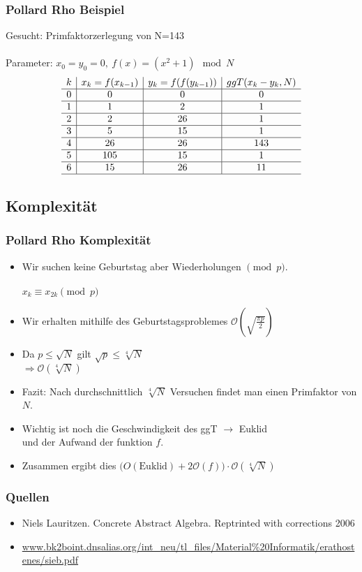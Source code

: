 \documentclass[mathserif, compress]{beamer}
\begin{document}
\begin{frame}
  \frametitle{Pollard Rho Beispiel}
Gesucht: Primfaktorzerlegung von N=143\\
\ \\
Parameter: $x_0 = y_0 = 0, \ f(x)=(x^2+1)\mod N$
	$$
  \begin{array}{c|c|c|c}
	k & x_k = f(x_{k-1}) & y_k = f(f(y_{k-1})) & ggT(x_k - y_k, N) \\ \hline 
        0 & 0 & 0 & 0 \\ \hline
	1 & 1 & 2 & 1 \\ \hline
	2 & 2 & 26 & 1 \\ \hline
	3 & 5 & 15 & 1 \\ \hline
	4 & 26 & 26 & 143 \\ \hline
	5 & 105 & 15 & 1 \\ \hline
	6 & 15 & 26 & 11 \\ \hline
  \end{array}
	$$
\end{frame}

\subsection{Komplexit\"at}

\begin{frame}
  \frametitle{Pollard Rho Komplexit\"at}
  \begin{itemize}
    \item Wir suchen keine Geburtstag aber Wiederholungen $\pmod p$.\\
    \ \\ $x_k \equiv x_{2k} \pmod p$
    \item Wir erhalten mithilfe des Geburtstagsproblemes $\mathcal O(\sqrt{\frac{\pi p}{2}})$
    \item Da $p\leq \sqrt{N}$ gilt $\sqrt{p} \leq \sqrt[4]{N}$\\
	  $\Rightarrow \mathcal O(\sqrt[4]{N})$
    \item Fazit: Nach durchschnittlich $\sqrt[4]{N}$ Versuchen findet man einen Primfaktor von $N$.
    \item Wichtig ist noch die Geschwindigkeit des ggT $\rightarrow$ Euklid\\
          und der Aufwand der funktion $f$.
    \item Zusammen ergibt dies $\mathcal (O(\text{Euklid})+2\mathcal O(f))\cdot\mathcal O(\sqrt[4]{N})$
  \end{itemize}
\end{frame}

\begin{frame}
\frametitle{Quellen}
  \begin{itemize}
    \item Niels Lauritzen. Concrete Abstract Algebra. Reptrinted with corrections 2006
    \item \url{www.bk2boint.dnsalias.org/int_neu/tl_files/Material\%20Informatik/erathostenes/sieb.pdf}
  \end{itemize}    
\end{frame}
\end{document}
